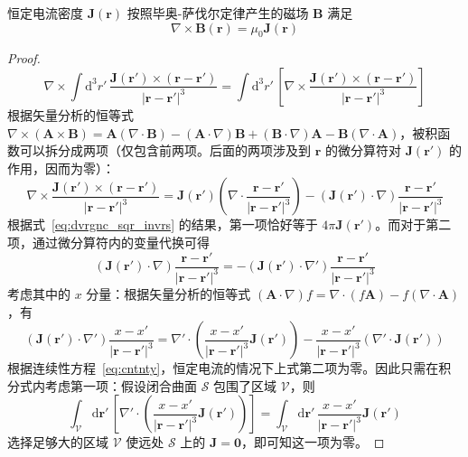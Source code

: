 \documentclass[cn,10pt,math=newtx,citestyle=gb7714-2015,bibstyle=gb7714-2015]{elegantbook}
\def\bm{\boldsymbol}
\def\mc{\mathcal}
\def\d{\mathrm d}
\begin{document}
\begin{theorem}
    恒定电流密度 $\bm J(\bm r)$ 按照毕奥-萨伐尔定律产生的磁场 $\bm B$ 满足
    \begin{equation*}
        \nabla\times\bm B(\bm r)=\mu_0\bm J(\bm r)
    \end{equation*}
\end{theorem}
\begin{proof}
    \begin{equation*}
        \nabla\times\int\d^3r'\,\frac{\bm J(\bm r')\times(\bm r-\bm r')}{|\bm r-\bm r'|^3} = \int\d^3r'\,\left[\nabla\times\frac{\bm J(\bm r')\times(\bm r-\bm r')}{|\bm r-\bm r'|^3}\right]
    \end{equation*}
    根据矢量分析的恒等式 $\nabla\times(\bm A\times\bm B)=\bm A(\nabla\cdot\bm B)-(\bm A\cdot\nabla)\bm B + (\bm B\cdot\nabla)\bm A - \bm B(\nabla\cdot\bm A)$，被积函数可以拆分成两项（仅包含前两项。后面的两项涉及到 $\bm r$ 的微分算符对 $\bm J(\bm r') $ 的作用，因而为零）：
    \begin{equation*}
        \nabla\times\frac{\bm J(\bm r')\times(\bm r-\bm r')}{|\bm r-\bm r'|^3} = \bm J(\bm r')\left(\nabla\cdot\frac{\bm r-\bm r'}{|\bm r-\bm r'|^3}\right) - (\bm J(\bm r')\cdot\nabla)\frac{\bm r-\bm r'}{|\bm r-\bm r'|^3}
    \end{equation*}
    根据式~\ref{eq:dvrgnc_sqr_invrs} 的结果，第一项恰好等于 $4\pi\bm J(\bm r')$。而对于第二项，通过微分算符内的变量代换可得
    \begin{equation*}
        (\bm J(\bm r')\cdot\nabla)\frac{\bm r-\bm r'}{|\bm r-\bm r'|^3} = -(\bm J(\bm r')\cdot\nabla')\frac{\bm r-\bm r'}{|\bm r-\bm r'|^3}
    \end{equation*}
    考虑其中的 $x$ 分量：根据矢量分析的恒等式 $(\bm A\cdot\nabla)f = \nabla\cdot(f\bm A)-f(\nabla\cdot\bm A)$，有
    \begin{equation*}
        (\bm J(\bm r')\cdot\nabla')\frac{x-x'}{|\bm r-\bm r'|^3} = \nabla'\cdot\left(\frac{x-x'}{|\bm r-\bm r'|^3}\bm J(\bm r')\right) - \frac{x-x'}{|\bm r-\bm r'|^3}(\nabla'\cdot\bm J(\bm r'))
    \end{equation*}
    根据连续性方程~\ref{eq:cntnty}，恒定电流的情况下上式第二项为零。因此只需在积分式内考虑第一项：假设闭合曲面 $\mc S$ 包围了区域 $\mc V$，则
    \begin{equation*}
        \int_{\mc V}\d\bm r'\,\left[\nabla'\cdot\left(\frac{x-x'}{|\bm r-\bm r'|^3}\bm J(\bm r')\right)\right]=\int_{\mc V}\d\bm r'\,\frac{x-x'}{|\bm r-\bm r'|^3}\bm J(\bm r')
    \end{equation*}
    选择足够大的区域 $\mc V$ 使远处 $\mc S$ 上的 $\bm J=\bm 0$，即可知这一项为零。
\end{proof}
\end{document}

